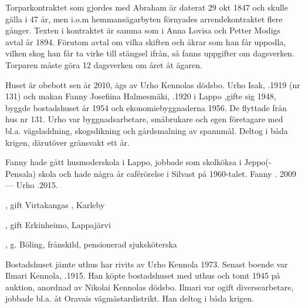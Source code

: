 Torparkontraktet som gjordes med Abraham är daterat 29 okt 1847 och skulle gälla i 47 år, men i.o.m hemmansägarbyten förnyades arrendekontraktet flere gånger. Texten i kontraktet är samma som i Anna Lovisa och Petter Modigs avtal år 1894. Förutom avtal om vilka skiften och åkrar som han får uppodla, vilken skog han får ta virke till stängsel ifrån, så fanns uppgifter om dagsverken. Torparen måste göra 12 dagsverken om året åt ägaren.



%



%
Huset är obebott sen år 2010, ägs av Urho Kennolas dödsbo. Urho Isak, .1919 (nr 131) och makan Fanny Josefiina Halmesmäki, .1920 i Lappo ,gifte sig 1948, byggde bostadshuset år 1954 och ekonomiebyggnaderna 1956. De flyttade från hus nr 131. Urho var byggnadsarbetare, småbrukare och egen företagare med bl.a. vägsladdning, skogsdikning och gårdsmalning av spannmål. Deltog i båda krigen, därutöver gränsvakt ett år.

Fanny hade gått husmoderskola i Lappo, jobbade som skolköksa i Jeppo(-Pensala) skola och hade några år caférörelse i Silvast på 1960-talet. Fanny . 2009  ---  Urho .2015.
\begin{jhchildren}
  \item {}, gift Virtakangas , Karleby
  \item {}, gift Erkinheimo, Lappajärvi
  \item {}, g. Böling, frånskild, pensionerad sjuksköterska
\end{jhchildren}



%



%
Bostadshuset jämte uthus har rivits av Urho Kennola 1973. Senast boende var Ilmari Kennola, .1915. Han köpte bostadshuset med uthus och tomt 1945 på auktion, anordnad av Nikolai Kennolas dödsbo. Ilmari var ogift diversearbetare, jobbade bl.a. åt Oravais vägmästardistrikt. Han deltog i båda krigen.


